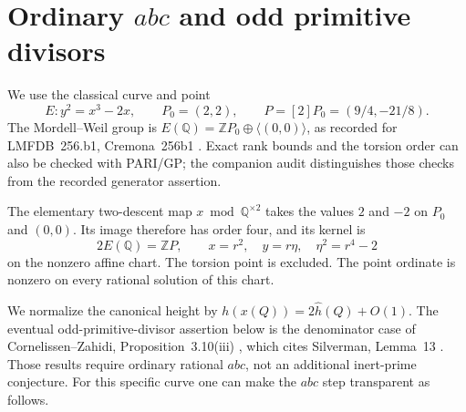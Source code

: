 \documentclass[11pt]{article}
\newcommand{\Q}{\mathbb Q}
\newcommand{\Z}{\mathbb Z}
\newcommand{\hhat}{\widehat h}
\begin{document}
\section{Ordinary \(abc\) and odd primitive divisors}

We use the classical curve and point
\begin{equation}\label{eq:curve}
 E:y^2=x^3-2x,\qquad P_0=(2,2),\qquad
 P=[2]P_0=(9/4,-21/8).
\end{equation}
The Mordell--Weil group is
\(E(\Q)=\Z P_0\oplus\langle(0,0)\rangle\), as recorded for
LMFDB~256.b1, Cremona~256b1 \cite{LMFDB}. Exact rank bounds and the
torsion order can also be checked with PARI/GP; the companion audit
distinguishes those checks from the recorded generator assertion.

The elementary two-descent map \(x\bmod\Q^{\times2}\) takes the values
\(2\) and \(-2\) on \(P_0\) and \((0,0)\). Its image therefore has order
four, and its kernel is
\begin{equation}\label{eq:chart}
 2E(\Q)=\Z P,\qquad
 x=r^2,\quad y=r\eta,\quad \eta^2=r^4-2
\end{equation}
on the nonzero affine chart. The torsion point is excluded. The point
ordinate is nonzero on every rational solution of this chart.

We normalize the canonical height by
\(h(x(Q))=2\hhat(Q)+O(1)\).
The eventual odd-primitive-divisor assertion below is the denominator
case of Cornelissen--Zahidi, Proposition~3.10(iii) \cite{CZ}, which cites
Silverman, Lemma~13 \cite{Silverman}. Those results require ordinary
rational \(abc\), not an additional inert-prime conjecture. For this
specific curve one can make the \(abc\) step transparent as follows.
\end{document}
